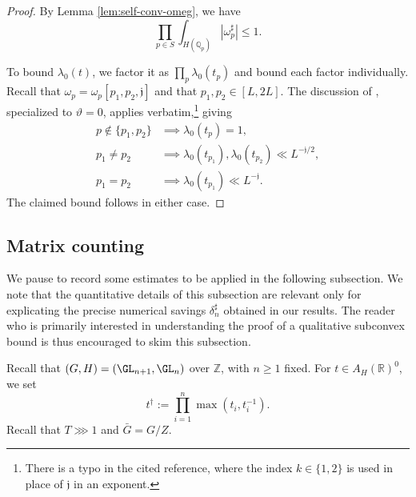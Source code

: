 \begin{proof}
  By Lemma \ref{lem:self-conv-omeg}, we have
  \begin{equation*}
    \prod_{p \in S} \int_{H(\mathbb{Q}_p)} |\omega_p^\sharp| \leq 1.
  \end{equation*}

  To bound $\lambda_0(t)$, we factor it as $\prod_p \lambda_0(t_p)$ and bound each factor individually.  Recall that $\omega_p = \omega_p[p_1, p_2, \mathfrak{j}]$ and that $p_1, p_2 \in [L,2 L]$.  The discussion of \cite[\S6.4]{2020arXiv201202187N}, specialized to $\vartheta = 0$, applies verbatim,\footnote{
    There is a typo in the cited reference, where the index $k \in \{1, 2\}$ is used in place of $\mathfrak{j}$ in an exponent.
  } giving
  \begin{align*}
    p \notin \{p_1, p_2 \} &\implies \lambda_0(t_p) = 1, \\
    p_1 \neq p_2 &\implies \lambda_0(t_{p_1}), \lambda_0(t_{p_2}) \ll L^{-\mathfrak{j}/2}, \\
    p_1 = p_2 &\implies \lambda_0(t_{p_1}) \ll L^{-\mathfrak{j}}.
  \end{align*}
  The claimed bound follows in either case.
\end{proof}

\subsection{Matrix counting}\label{sec:matrix-counting}
We pause to record some estimates to be applied in the following subsection.  We note that the quantitative details of this subsection are relevant only for explicating the precise numerical savings $\delta_n^\sharp$ obtained in our results.  The reader who is primarily interested in understanding the proof of a qualitative subconvex bound is thus encouraged to skim this subsection.

Recall that $(G,H) = (\GL_{n+1},\GL_n)$ over $\mathbb{Z}$, with $n \geq 1$ fixed.  For $t \in A_H(\mathbb{R})^0$, we set
\begin{equation*}
  t^\dagger  := \prod_{i=1}^n \max(t_i, t_i^{-1}).
\end{equation*}
Recall that $T \ggg 1$ and $\bar{G} = G/Z$.


